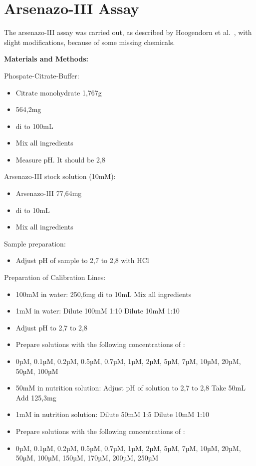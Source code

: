 \newpage

\section{Arsenazo-III Assay\authorA}

The arsenazo-III assay was carried out, as described by Hoogendorn et al.~\cite{arsenazo3assay}, with slight modifications, because of some missing chemicals.

\textbf{Materials and Methods:}

Phospate-Citrate-Buffer:
\begin{itemize}
    \item Citrate monohydrate 1,767g
    \item {} 564,2mg
    \item di to 100mL
    \item Mix all ingredients
    \item Measure pH. It should be 2,8
\end{itemize}

Arsenazo-III stock solution (10mM):
\begin{itemize}
    \item Arsenazo-III 77,64mg
    \item di to 10mL
    \item Mix all ingredients
\end{itemize}

Sample preparation:
\begin{itemize}
    \item Adjust pH of sample to 2,7 to 2,8 with HCl
\end{itemize}

Preparation of Calibration Lines:
\begin{itemize}
    \item {} 100mM in water:
    \subitem {} 250,6mg
    \subitem di to 10mL
    \subitem Mix all ingredients
    \item {} 1mM in water:
    \subitem Dilute  100mM 1:10
    \subitem Dilute  10mM 1:10
    \item Adjust pH to 2,7 to 2,8
    \item Prepare solutions with the following concentrations of :
    \item 0µM, 0.1µM, 0.2µM, 0.5µM, 0.7µM, 1µM, 2µM, 5µM, 7µM, 10µM, 20µM, 50µM, 100µM
    \item {} 50mM in nutrition solution:
    \subitem Adjust pH of solution to 2,7 to 2,8
    \subitem Take 50mL
    \subitem Add  125,3mg
    \item {} 1mM in nutrition solution:
    \subitem Dilute  50mM 1:5
    \subitem Dilute  10mM 1:10
    \item Prepare solutions with the following concentrations of :
    \item 0µM, 0.1µM, 0.2µM, 0.5µM, 0.7µM, 1µM, 2µM, 5µM, 7µM, 10µM, 20µM, 50µM, 100µM, 150µM, 170µM, 200µM, 250µM
\end{itemize}


